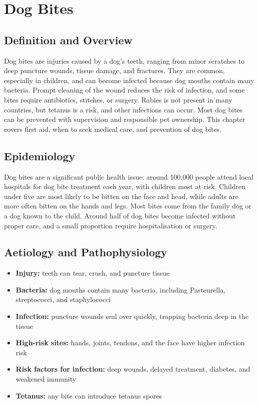 \chapter{Dog Bites}

\section*{Definition and Overview}
Dog bites are injuries caused by a dog's teeth, ranging from minor scratches to deep puncture wounds, tissue damage, and fractures. They are common, especially in children, and can become infected because dog mouths contain many bacteria. Prompt cleaning of the wound reduces the risk of infection, and some bites require antibiotics, stitches, or surgery. Rabies is not present in many countries, but tetanus is a risk, and other infections can occur. Most dog bites can be prevented with supervision and responsible pet ownership. This chapter covers first aid, when to seek medical care, and prevention of dog bites.

\section*{Epidemiology}
Dog bites are a significant public health issue: around 100,000 people attend local hospitals for dog bite treatment each year, with children most at risk. Children under five are most likely to be bitten on the face and head, while adults are more often bitten on the hands and legs. Most bites come from the family dog or a dog known to the child. Around half of dog bites become infected without proper care, and a small proportion require hospitalisation or surgery.

\section*{Aetiology and Pathophysiology}
\begin{itemize}
    \item \textbf{Injury:} teeth can tear, crush, and puncture tissue
    \item \textbf{Bacteria:} dog mouths contain many bacteria, including Pasteurella, streptococci, and staphylococci
    \item \textbf{Infection:} puncture wounds seal over quickly, trapping bacteria deep in the tissue
    \item \textbf{High-risk sites:} hands, joints, tendons, and the face have higher infection risk
    \item \textbf{Risk factors for infection:} deep wounds, delayed treatment, diabetes, and weakened immunity
    \item \textbf{Tetanus:} any bite can introduce tetanus spores
\end{itemize}

